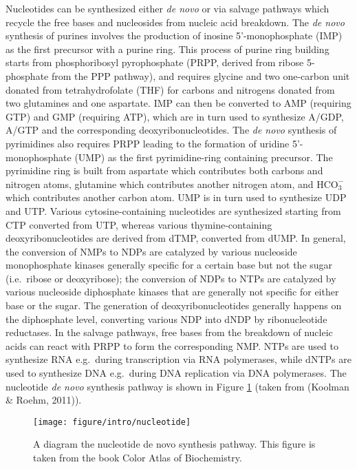 \documentclass[12pt,twoside,openany,\mydriver]{thesis}  %
\begin{document}
Nucleotides can be synthesized either \emph{de novo} or via salvage pathways which recycle the free bases and nucleosides from nucleic acid breakdown. The \emph{de novo} synthesis of purines involves the production of inosine 5'-monophosphate (IMP) as the first precursor with a purine ring. This process of purine ring building starts from phosphoribosyl pyrophosphate (PRPP, derived from ribose 5-phosphate from the PPP pathway), and requires glycine and two one-carbon unit donated from tetrahydrofolate (THF) for carbons and nitrogens donated from two glutamines and one aspartate. IMP can then be converted to AMP (requiring GTP) and GMP (requiring ATP), which are in turn used to synthesize A/GDP, A/GTP and the corresponding deoxyribonucleotides. The \emph{de novo} synthesis of pyrimidines also requires PRPP leading to the formation of uridine 5'-monophosphate (UMP) as the first pyrimidine-ring containing precursor. The pyrimidine ring is built from aspartate which contributes both carbons and nitrogen atoms, glutamine which contributes another nitrogen atom, and \(\mathrm{HCO_3^-}\) which contributes another carbon atom. UMP is in turn used to synthesize UDP and UTP. Various cytosine-containing nucleotides are synthesized starting from CTP converted from UTP, whereas various thymine-containing deoxyribonucleotides are derived from dTMP, converted from dUMP. In general, the conversion of NMPs to NDPs are catalyzed by various nucleoside monophosphate kinases generally specific for a certain base but not the sugar (i.e.~ribose or deoxyribose); the conversion of NDPs to NTPs are catalyzed by various nucleoside diphosphate kinases that are generally not specific for either base or the sugar. The generation of deoxyribonucleotides generally happens on the diphosphate level, converting various NDP into dNDP by ribonucleotide reductases. In the salvage pathways, free bases from the breakdown of nucleic acids can react with PRPP to form the corresponding NMP. NTPs are used to synthesize RNA e.g.~during transcription via RNA polymerases, while dNTPs are used to synthesize DNA e.g.~during DNA replication via DNA polymerases. The nucleotide \emph{de novo} synthesis pathway is shown in Figure \ref{fig:intro-nucleotide} (taken from (Koolman \& Roehm, 2011)).
\begin{figure}
\texttt{[image: figure/intro/nucleotide]} \caption{A diagram the nucleotide de novo synthesis pathway. This figure is taken from the book Color Atlas of Biochemistry.}\label{fig:intro-nucleotide}
\end{figure}
\end{document}
